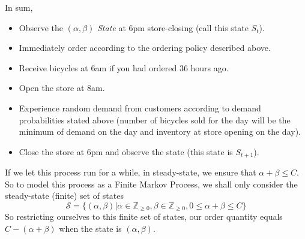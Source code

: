 In sum,
\begin{itemize}
	\item Observe the $(\alpha, \beta)$ \textit{State} at 6pm store-closing (call this state $S_t$).
	\item Immediately order according to the ordering policy described above.
	\item Receive bicycles at 6am if you had ordered 36 hours ago.
	\item Open the store at 8am.
	\item Experience random demand from customers according to demand probabilities stated above (number of bicycles sold for the day will be the minimum of demand on the day and inventory at store opening on the day).
	\item Close the store at 6pm and observe the state (this state is $S_{t+1}$).
\end{itemize}

If we let this process run for a while, in steady-state, we ensure that $\alpha + \beta \leq C$. So to model this process as a Finite Markov Process, we shall only consider the steady-state (finite) set of states
$$\mathcal{S} = \{(\alpha, \beta) | \alpha \in \mathbb{Z}_{\geq 0}, \beta \in \mathbb{Z}_{\geq 0}, 0 \leq \alpha + \beta \leq C\}$$
So restricting ourselves to this finite set of states, our order quantity equals $C - (\alpha + \beta)$ when the state is $(\alpha, \beta)$.

